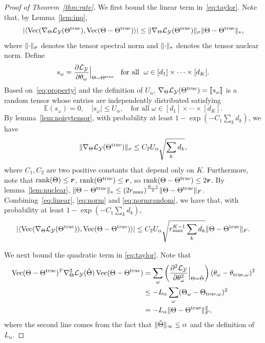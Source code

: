 \documentclass{article}
\theoremstyle{plain}
\theoremstyle{definition}
\begin{document}
\begin{proof}[Proof of Theorem~\ref{thm:rate}]
We first bound the linear term in~\eqref{eq:taylor}. Note that, by Lemma~\ref{lem:inq},
\begin{equation}\label{eq:linear}
|\langle\operatorname{Vec}(\nabla_{\Theta}\mathcal{L}_{\mathcal{Y}}(\Theta^{\mathrm{true}}), \operatorname{Vec}(\Theta-\Theta^{\mathrm{true}})  \rangle|\leq \lVert\nabla_{\Theta}\mathcal{L}_{\mathcal{Y}}(\Theta^{\mathrm{true}})\rVert_\sigma \lVert\Theta-\Theta^{\mathrm{true}}\rVert_*,
\end{equation}
where $\lVert\cdot\rVert_\sigma$ denotes the tensor spectral norm and $\lVert\cdot\rVert_*$ denotes the tensor nuclear norm. Define
\[
s_\omega={\partial \mathcal{L}_{\mathcal{Y}}\over \partial \theta_\omega}\Big|_{\Theta=\Theta^{\mathrm{true}}} \;\; \textrm{ for all } \; \omega\in[d_1]\times\cdots\times [d_K].
\]
Based on~\eqref{eq:property} and the definition of $U_\alpha$, $\nabla_{\Theta}\mathcal{L}_{\mathcal{Y}}(\Theta^{\mathrm{true}})=\llbracket s_{\omega} \rrbracket$ is a random tensor whose entries are independently distributed satisfying
\begin{equation}\label{eq:norm}
\mathbb{E}(s_\omega)=0,\quad |s_\omega|\leq U_\alpha, \quad \text{for all }\omega\in[d_1]\times \cdots \times [d_K].
\end{equation}
By lemma~\ref{lem:noisytensor}, with probability at least $1-\exp(-C_1 \sum_kd_k)$, we have
\begin{equation}\label{eq:normrandom}
\lVert\nabla_{\Theta}\mathcal{L}_{\mathcal{Y}}(\Theta^{\mathrm{true}})\rVert_\sigma \leq C_2 U_\alpha\sqrt{\sum_k d_k},
\end{equation}
where $C_1, C_2$ are two positive constants that depend only on $K$. Furthermore, note that $\text{rank}(\Theta)\leq \bm{r}$, $\text{rank}(\Theta^{\mathrm{true}})\leq \bm{r}$, so $\text{rank}(\Theta-\Theta^{\mathrm{true}})\leq 2\bm{r}$. By lemma~\ref{lem:nuclear}, $\lVert\Theta-\Theta^{\mathrm{true}}\rVert_*\leq (2r_{\max})^{K-1\over 2}\lVert\Theta-\Theta^{\mathrm{true}}\rVert_F$. Combining~\eqref{eq:linear}, \eqref{eq:norm} and \eqref{eq:normrandom}, we have that, with probability at least $1-\exp(-C_1 \sum_kd_k)$,
\begin{equation}\label{eq:linearconclusion}
|\langle \operatorname{Vec}(\nabla_{\Theta}\mathcal{L}_{\mathcal{Y}}(\Theta^{\mathrm{true}})), \operatorname{Vec}(\Theta-\Theta^{\mathrm{true}})  \rangle | \leq C_2 U_\alpha  \sqrt{r_{\max}^{K-1} \sum_k d_k}  \lVert\Theta-\Theta^{\mathrm{true}}\rVert_F.
\end{equation}

We next bound the quadratic term in \eqref{eq:taylor}. Note that
\begin{align}\label{eq:quadratic}
 \operatorname{Vec}(\Theta-\Theta^{\mathrm{true}})^T \nabla^2_{\Theta}\mathcal{L}_{\mathcal{Y}}(\check{\Theta})\operatorname{Vec}(\Theta-\Theta^{\mathrm{true}})&=\sum_\omega \left( {\partial^2\mathcal{L}_{\mathcal{Y}}\over \partial \theta^2_\omega} \Big|_{\Theta=\check\Theta} \right)(\theta_\omega-\theta_{{\text{true}},\omega})^2 \nonumber \\
&\leq - L_\alpha\sum_{\omega}(\Theta_{\omega}-\Theta_{\text{true},\omega})^2 \nonumber \\
&=-L_\alpha\lVert\Theta-\Theta^{\mathrm{true}}\rVert_F^2,
\end{align}
where the second line comes from the fact that  $\lVert\check\Theta\rVert_\infty\leq \alpha$ and the definition of $L_\alpha$.


\end{proof}
\end{document}

